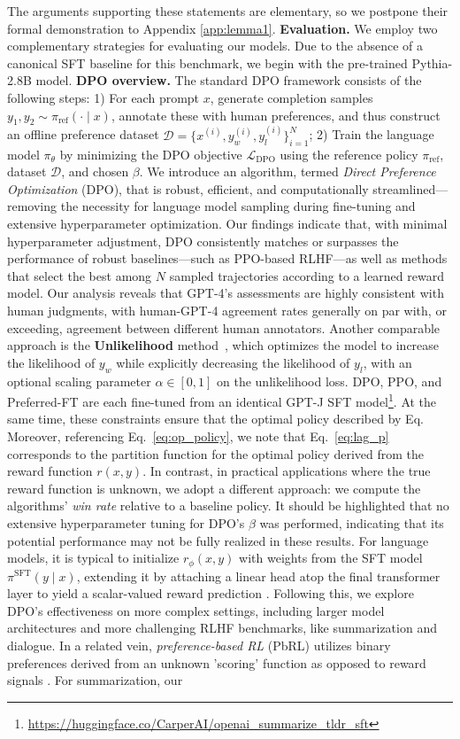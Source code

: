 The arguments supporting these statements are elementary, so we postpone their formal demonstration to Appendix \ref{app:lemma1}. \textbf{Evaluation.} We employ two complementary strategies for evaluating our models. Due to the absence of a canonical SFT baseline for this benchmark, we begin with the pre-trained Pythia-2.8B model. \textbf{DPO overview.} The standard DPO framework consists of the following steps: 1) For each prompt $x$, generate completion samples $y_1, y_2 \sim \pi_\text{ref}(\cdot \mid x)$, annotate these with human preferences, and thus construct an offline preference dataset $\mathcal{D} = \{x^{(i)}, y_w^{(i)}, y_l^{(i)}\}_{i=1}^N$; 2) Train the language model $\pi_\theta$ by minimizing the DPO objective $\mathcal{L}_\text{DPO}$ using the reference policy $\pi_\text{ref}$, dataset $\mathcal{D}$, and chosen $\beta$. We introduce an algorithm, termed \textit{Direct Preference Optimization} (DPO), that is robust, efficient, and computationally streamlined—removing the necessity for language model sampling during fine-tuning and extensive hyperparameter optimization. Our findings indicate that, with minimal hyperparameter adjustment, DPO consistently matches or surpasses the performance of robust baselines—such as PPO-based RLHF—as well as methods that select the best among $N$ sampled trajectories according to a learned reward model. Our analysis reveals that GPT-4's assessments are highly consistent with human judgments, with human-GPT-4 agreement rates generally on par with, or exceeding, agreement between different human annotators. Another comparable approach is the \textbf{Unlikelihood} method~\citep{welleck2019neural}, which optimizes the model to increase the likelihood of $y_w$ while explicitly decreasing the likelihood of $y_l$, with an optional scaling parameter $\alpha\in[0,1]$ on the unlikelihood loss. DPO, PPO, and Preferred-FT are each fine-tuned from an identical GPT-J SFT model\footnote{\url{https://huggingface.co/CarperAI/openai_summarize_tldr_sft}}. At the same time, these constraints ensure that the optimal policy described by Eq. Moreover, referencing Eq.~\ref{eq:op_policy}, we note that Eq.~\ref{eq:lag_p} corresponds to the partition function for the optimal policy derived from the reward function $r(x, y)$. In contrast, in practical applications where the true reward function is unknown, we adopt a different approach: we compute the algorithms’ \textit{win rate} relative to a baseline policy. It should be highlighted that no extensive hyperparameter tuning for DPO’s $\beta$ was performed, indicating that its potential performance may not be fully realized in these results. For language models, it is typical to initialize $r_{\phi}(x, y)$ with weights from the SFT model $\pi^\text{SFT}(y \mid x)$, extending it by attaching a linear head atop the final transformer layer to yield a scalar-valued reward prediction \cite{ziegler2020finetuning}. Following this, we explore DPO’s effectiveness on more complex settings, including larger model architectures and more challenging RLHF benchmarks, like summarization and dialogue. In a related vein, \textit{preference-based RL} (PbRL) utilizes binary preferences derived from an unknown 'scoring' function as opposed to reward signals \citep{BusaFekete2014, ruiz2023dueling}. For summarization, our 